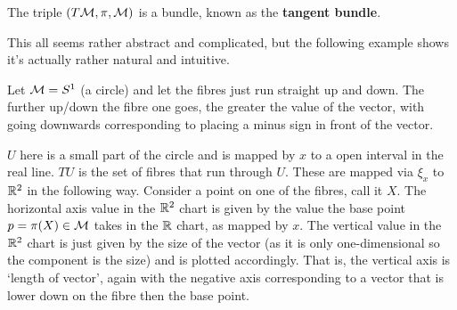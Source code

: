    The triple $(T\mathcal{M},\pi,\mathcal{M})$ is a bundle, known as the \textbf{tangent bundle}. 
\ed 

This all seems rather abstract and complicated, but the following example shows it's actually rather natural and intuitive. 

\bex 
    Let $\mathcal{M}=S^1$ (a circle) and let the fibres just run straight up and down. The further up/down the fibre one goes, the greater the value of the vector, with going downwards corresponding to placing a minus sign in front of the vector.

    $U$ here is a small part of the circle and is mapped by $x$ to a open interval in the real line. $TU$ is the set of fibres that run through $U$. These are mapped via $\xi_x$ to $\mathbb{R}^2$ in the following way. Consider a point on one of the fibres, call it $X$. The horizontal axis value in the $\mathbb{R}^2$ chart is given by the value the base point $p=\pi(X)\in\mathcal{M}$ takes in the $\mathbb{R}$ chart, as mapped by $x$. The vertical value in the $\mathbb{R}^2$ chart is just given by the size of the vector (as it is only one-dimensional so the component is the size) and is plotted accordingly. That is, the vertical axis is `length of vector', again with the negative axis corresponding to a vector that is lower down on the fibre then the base point.

